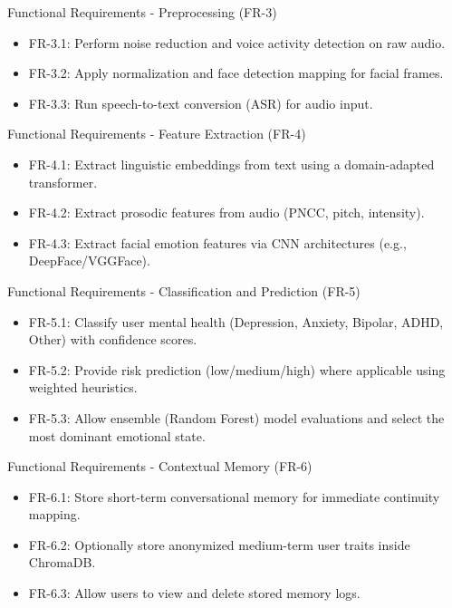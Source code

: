 \documentclass[11pt]{beamer}
\begin{document}
\begin{frame}{Functional Requirements - Preprocessing (FR-3)}
\begin{itemize}
    \item FR-3.1: Perform noise reduction and voice activity detection on raw audio.
    \item FR-3.2: Apply normalization and face detection mapping for facial frames.
    \item FR-3.3: Run speech-to-text conversion (ASR) for audio input.
\end{itemize}
\end{frame}

\begin{frame}{Functional Requirements - Feature Extraction (FR-4)}
\begin{itemize}
    \item FR-4.1: Extract linguistic embeddings from text using a domain-adapted transformer.
    \item FR-4.2: Extract prosodic features from audio (PNCC, pitch, intensity).
    \item FR-4.3: Extract facial emotion features via CNN architectures (e.g., DeepFace/VGGFace).
\end{itemize}
\end{frame}

\begin{frame}{Functional Requirements - Classification and Prediction (FR-5)}
\begin{itemize}
    \item FR-5.1: Classify user mental health (Depression, Anxiety, Bipolar, ADHD, Other) with confidence scores.
    \item FR-5.2: Provide risk prediction (low/medium/high) where applicable using weighted heuristics.
    \item FR-5.3: Allow ensemble (Random Forest) model evaluations and select the most dominant emotional state.
\end{itemize}
\end{frame}

\begin{frame}{Functional Requirements - Contextual Memory (FR-6)}
\begin{itemize}
    \item FR-6.1: Store short-term conversational memory for immediate continuity mapping.
    \item FR-6.2: Optionally store anonymized medium-term user traits inside ChromaDB.
    \item FR-6.3: Allow users to view and delete stored memory logs.
\end{itemize}
\end{frame}
\end{document}
